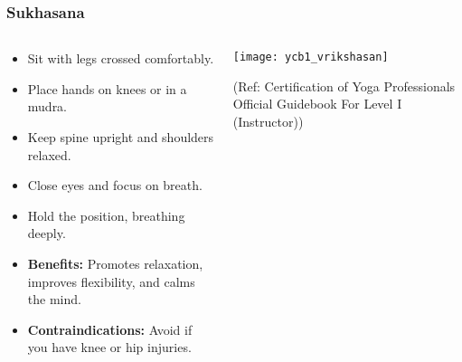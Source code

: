 \begin{frame}[fragile]\frametitle{Sukhasana}
\begin{columns}
    \begin{column}[T]{0.5\linewidth}
      \begin{itemize}
        \item Sit with legs crossed comfortably.
        \item Place hands on knees or in a mudra.
        \item Keep spine upright and shoulders relaxed.
        \item Close eyes and focus on breath.
        \item Hold the position, breathing deeply.
        \item \textbf{Benefits:} Promotes relaxation, improves flexibility, and calms the mind.
        \item \textbf{Contraindications:} Avoid if you have knee or hip injuries.
      \end{itemize}
    \end{column}
    \begin{column}[T]{0.5\linewidth}
        \begin{center}
        \begin{center}
		        \texttt{[image: ycb1\_vrikshasan]}
				
				{\tiny (Ref: Certification  of Yoga Professionals Official Guidebook For Level I (Instructor))}	        
		\end{center}   
        \end{center}    
    \end{column}
  \end{columns}
\end{frame}

